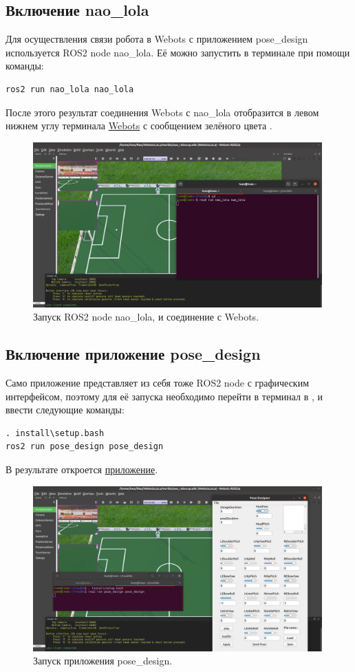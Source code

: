 \documentclass[12pt,a4paper]{article}
\begin{document}
\subsection{Включение nao\_lola}
Для осуществления связи робота в Webots с приложением pose\_design используется ROS2 node nao\_lola. Её можно запустить в терминале при помощи команды:\\
\begin{verbatim}
ros2 run nao_lola nao_lola
\end{verbatim}
После этого результат соединения Webots с nao\_lola отобразится в левом нижнем углу терминала \hyperref[fig:webotsNaoLola]{Webots} с сообщением зелёного цвета .
\begin{figure}[h!]
    \centering
    \includegraphics[width = 0.99\textwidth]{./images/webotsNaoLola.png}
    \caption{Запуск ROS2 node nao\_lola, и соединение с Webots.}
    \label{fig:webotsNaoLola}
\end{figure}
\newpage
\subsection{Включение приложение pose\_design}
Само приложение представляет из себя тоже ROS2 node с графическим интерфейсом, поэтому для её запуска необходимо перейти в терминал в , и ввести следующие команды: 
\begin{verbatim}
. install\setup.bash
ros2 run pose_design pose_design
\end{verbatim}
В результате откроется \hyperref[fig:pose_design]{приложение}.
\begin{figure}[h!]
    \centering
    \includegraphics[width = 0.99\textwidth]{./images/webotsPoseDesign.png}
    \caption{Запуск приложения pose\_design.}
    \label{fig:pose_design}
\end{figure}
\newpage
\end{document}
